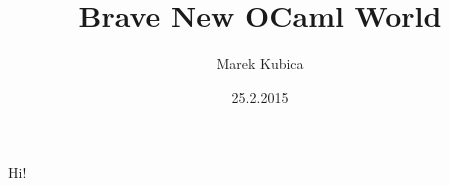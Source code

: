 \documentclass{beamer}
\title{Brave New OCaml World}
\author{Marek Kubica}
\institute{Lambda Days}
\date{25.2.2015}
\begin{document}
\maketitle

\begin{frame}
  Hi!
\end{frame}
\end{document}
